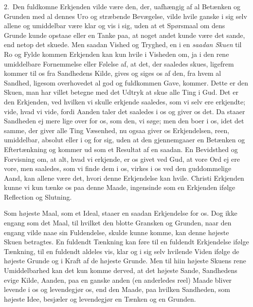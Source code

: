 \documentclass[12pt,a4paper]{book}
\newcommand{\apage}[1]{\marginnote{\footnotesize\textit{[#1]}}}
\begin{document}
2.~Den fuldkomne Erkjenden vilde være den, der, uafhængig af al Betænken og
Grunden med al dennes Uro og stræbende Bevægelse, vilde hvile ganske i sig selv
allene og umiddelbar være klar og vis i sig, uden at et Spørsmaal om dens Grunde
kunde opstaae eller en Tanke paa, at noget andet kunde være det sande, end netop
det skuede. Men saadan Vished og Tryghed, en i en \emph{saadan Skuen} til Ro og Fylde
kommen Erkjenden kan kun hvile i Visheden om, ja i den rene umiddelbare
Fornemmelse eller Følelse af, at det, der saaledes skues, ligefrem kommer til os
fra Sandhedens Kilde, gives og siges os af den, fra hvem al Sandhed, ligesom
overhovedet al god og fuldkommen Gave, kommer. Dette er den Skuen, man har villet
betegne med det Udtryk at skue alle Ting i Gud. Det er den Erkjenden, \apage{41}  ved hvilken
vi skulle erkjende saaledes, som vi selv ere erkjendte; vide, hvad vi vide, fordi
Aanden taler det saaledes i os og giver os det. Da staaer Sandheden ej mere lige
over for os, som den, vi søge; men den boer i os, idet det samme, der giver alle
Ting Væsenhed, nu ogsaa giver os Erkjendelsen, reen, umiddelbar, absolut eller i
og for sig, uden at den gjennemgaaer en Betænken og Eftertænkning og kommer ud
som et Resultat af en saadan. En Bevidsthed og Forvisning om, at alt, hvad vi
erkjende, er os givet ved Gud, at vore Ord ej ere vore, men saaledes, som vi
finde dem i os, virkes i os ved den guddommelige Aand, kan allene være det, hvori
denne Erkjendelse kan hvile. Christi Erkjenden kunne vi kun tænke os paa denne
Maade, ingensinde som en Erkjenden ifølge Reflection og Slutning.

Som højeste Maal, som et Ideal, staaer en saadan Erkjendelse for os. Dog ikke
engang som det Maal, til hvilket den blotte Gransken og Grunden, naar den engang
vilde naae sin Fuldendelse, skulde kunne komme, kan denne højeste Skuen
betragtes. En fuldendt Tænkning kan føre til en fuldendt Erkjendelse ifølge
Tænkning, til en fuldendt aldeles vis, klar og i sig selv hvilende Viden ifølge
de højeste Grunde og i Kraft af de højeste Grunde. Men til hiin højeste Skuens
rene Umiddelbarhed kan det kun komme derved, at det højeste Sande, Sandhedens
evige Kilde, Aanden, paa en ganske anden (en anderledes reel) \apage{42} Maade bliver
levende i os og levendegjør os, end den Maade, paa hvilken Sandheden, som højeste
Idee, besjæler og levendegjør en Tænken og en Grunden.
\end{document}
